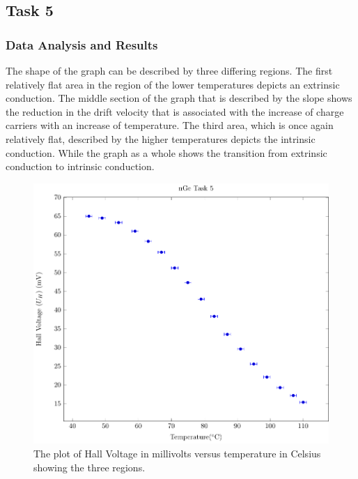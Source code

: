 \documentclass[a4paper]{article}
\begin{document}
\subsection{Task 5}

\subsubsection{Data Analysis and Results}

\qq The shape of the graph can be described by three differing
regions. The first relatively flat area in the region of the lower
temperatures depicts an extrinsic conduction. The middle section of
the graph that is described by the slope shows the reduction in the
drift velocity that is associated with the increase of charge carriers
with an increase of temperature. The third area, which is once again
relatively flat, described by the higher temperatures depicts the
intrinsic conduction. While the graph as a whole shows the transition
from extrinsic conduction to intrinsic conduction.

\begin{figure}[H]
  \begin{center}
    \includegraphics[scale=0.7]{NGePlots/Task5/nGeTask5.pdf}
  \end{center}
  \caption{The plot of Hall Voltage in millivolts versus temperature in Celsius
    showing the three regions.}
  \label{gph:nt5}
\end{figure}
\end{document}

